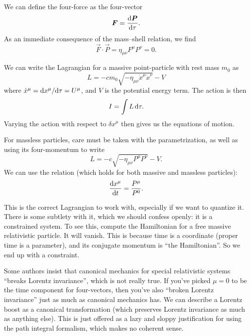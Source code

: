 We can define the four-force as the four-vector
\begin{equation}
\boldsymbol{F} = \frac{\mathrm{d}\boldsymbol{P}}{\mathrm{d}\tau}.
\end{equation}
As an immediate consequence of the mass--shell relation, we find
\begin{equation}
\vec{F}\cdot\vec{P} = \eta_{\mu\nu}F^{\mu}P^{\nu} = 0.
\end{equation}

\label{chunk:relativity:lagrangian-for-point-particle}
We can write the Lagrangian for a massive point-particle with rest mass
$m_{0}$ as
\begin{equation}
L = -cm_{0}\sqrt{-\eta_{\mu\nu}\dot{x}^{\mu}\dot{x}^{\nu}} - V
\end{equation}
where $\dot{x}^{\mu} = \mathrm{d} x^{\mu}/\mathrm{d}\tau = U^{\mu}$, and $V$ is the potential
energy term. The action is then 
\begin{equation}
I = \int L\,\mathrm{d}\tau.
\end{equation}
Varying the action with respect to $\delta x^{\mu}$ then gives us the
equations of motion.

For massless particles, care must be taken with the parametrization, as
well as using its four-momentum to write
\begin{equation}
L = -c\sqrt{-\eta_{\mu\nu}P^{\mu}P^{\nu}} - V.
\end{equation}
We can use the relation (which holds for both massive and massless particles):
\begin{equation}
\frac{\mathrm{d} x^{\mu}}{\mathrm{d} t} = \frac{P^{\mu}}{P^{0}}.
\end{equation}

\begin{danger}
This is the correct Lagrangian to work with, especially if we want to
quantize it. There is some subtlety with it, which we should confess
openly: it is a constrained system. To see this, compute the Hamiltonian
for a free massive relativistic particle. It will vanish. This is
because time is a coordinate (proper time is a parameter), and its
conjugate momentum is ``the Hamiltonian''. So we end up with a
constraint. 
\end{danger}

\begin{ddanger}
Some authors insist that canonical mechanics for special relativistic
systems ``breaks Lorentz invariance'', which is not really true. If
you've picked $\mu=0$ to be the time component for four-vectors, then
you've also ``broken Lorentz invariance'' just as much as canonical
mechanics has. We can describe a Lorentz boost as a canonical
transformation (which preserves Lorentz invariance as much as anything
else). This is just offered as a lazy and sloppy justification for using
the path integral formalism, which makes no coherent sense.
\end{ddanger}

